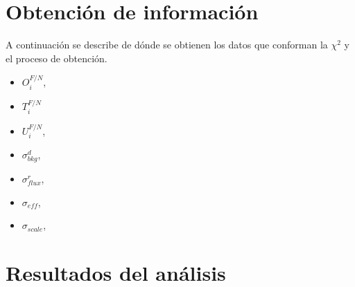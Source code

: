 \documentclass[10pt,a4paper]{report}
\begin{document}
\section*{Obtención de información}

A continuación se describe de dónde se 
obtienen los datos que conforman la 
$\chi^2$ y el proceso de obtención. 

\begin{itemize}
  \item $O_{i}^{F/N}$, 
  \item $T_{i}^{F/N}$
  \item $U_{i}^{F/N}$, 
  \item $\sigma^{d}_{bkg}$, 
  \item $\sigma^{r}_{flux}$, 
  \item $\sigma_{eff}$, 
  \item $\sigma_{scale}$,
\end{itemize}



\section*{Resultados del análisis}
\end{document}
